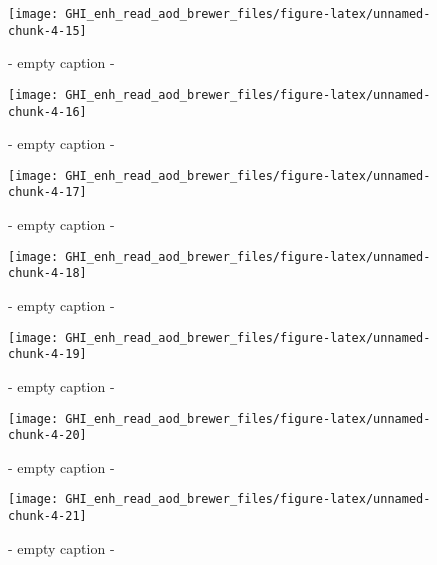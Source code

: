 \documentclass[
  10pt,
  a4paper,oneside]{article}
\begin{document}
\begin{figure}[H]

{\centering \texttt{[image: GHI\_enh\_read\_aod\_brewer\_files/figure-latex/unnamed-chunk-4-15]} 

}

\caption{ - empty caption - }\label{fig:unnamed-chunk-4-15}
\end{figure}
\begin{figure}[H]

{\centering \texttt{[image: GHI\_enh\_read\_aod\_brewer\_files/figure-latex/unnamed-chunk-4-16]} 

}

\caption{ - empty caption - }\label{fig:unnamed-chunk-4-16}
\end{figure}
\begin{figure}[H]

{\centering \texttt{[image: GHI\_enh\_read\_aod\_brewer\_files/figure-latex/unnamed-chunk-4-17]} 

}

\caption{ - empty caption - }\label{fig:unnamed-chunk-4-17}
\end{figure}
\begin{figure}[H]

{\centering \texttt{[image: GHI\_enh\_read\_aod\_brewer\_files/figure-latex/unnamed-chunk-4-18]} 

}

\caption{ - empty caption - }\label{fig:unnamed-chunk-4-18}
\end{figure}
\begin{figure}[H]

{\centering \texttt{[image: GHI\_enh\_read\_aod\_brewer\_files/figure-latex/unnamed-chunk-4-19]} 

}

\caption{ - empty caption - }\label{fig:unnamed-chunk-4-19}
\end{figure}
\begin{figure}[H]

{\centering \texttt{[image: GHI\_enh\_read\_aod\_brewer\_files/figure-latex/unnamed-chunk-4-20]} 

}

\caption{ - empty caption - }\label{fig:unnamed-chunk-4-20}
\end{figure}
\begin{figure}[H]

{\centering \texttt{[image: GHI\_enh\_read\_aod\_brewer\_files/figure-latex/unnamed-chunk-4-21]} 

}

\caption{ - empty caption - }\label{fig:unnamed-chunk-4-21}
\end{figure}
\end{document}
